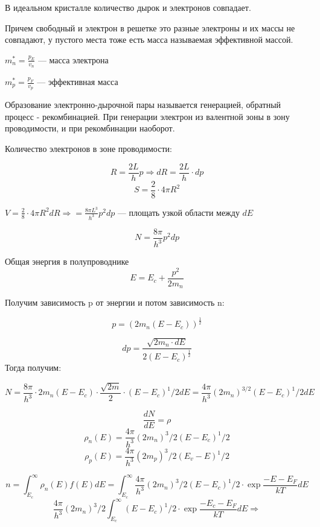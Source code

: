 \documentclass[../main.tex]{subfiles}
\begin{document}
В идеальном кристалле количество дырок и электронов совпадает.

Причем свободный и электрон в решетке это разные электроны и их массы не совпадают, у пустого места тоже есть масса называемая эффективной массой.

\begin{center}
    \(\displaystyle m^{*}_n = \frac{p_E}{v_n}\) --- масса электрона   
\end{center}

\begin{center}
    \(\displaystyle m^{*}_p = \frac{p_F}{v_p}\) --- эффективная масса   
\end{center}


 Образование электронно-дырочной пары называется генерацией, обратный процесс - рекомбинацией. 
При генерации электрон из валентной зоны в зону проводимости, и при рекомбинации наоборот.

\vspace{15px}

Количество электронов в зоне проводимости:

\[R = \frac{2L}{h}p \Rightarrow dR = \frac{2L}{h}\cdot dp  \]
\[S = \frac{2}{8} \cdot 4 \pi R^2\]

\begin{center}
    \(\displaystyle V = \frac{2}{8} \cdot 4 \pi R^2 d R \Rightarrow = \frac{8 \pi L^3}{h^3} p^2 d p\) --- площать узкой области между $d E$ 
\end{center}

\[N = \frac{8 \pi}{h^3} p^2 d p\]

Общая энергия в полупроводнике
\[E = E_c + \frac{p^2}{2m_n}\]

Получим зависимость p от энергии и потом зависимость n:

\[p =  (2m_n(E-E_c))^\frac{1}{2}\]

\[d p  = \frac{\sqrt{2m_n \cdot dE}}{2(E - E_c)^{\frac{1}{2}}}\]
Тогда получим:

\[N = \frac{8 \pi}{h^3} \cdot 2m_n(E-E_c) \cdot \frac{\sqrt{2m}}{2} \cdot (E-E_c)^1/2 dE = \frac{4 \pi}{h^3}(2m_n)^{3/2} (E-E_c)^1/2 dE\]

\[ \frac{dN}{dE} = \rho\]
\[\rho_n(E) = \frac{4 \pi}{h^3}(2m_n)^3/2 (E-E_c)^1/2\]
\[\rho_p(E) = \frac{4 \pi}{h^3}(2m_p)^3/2 (E_v-E)^1/2\]

\[n = \int_{E_c}^{\infty} \rho_n(E) f(E) dE = \int_{E_c}^{\infty} \frac{4 \pi}{h^3}(2m_n)^3/2 (E-E_c)^1/2 \cdot \exp{\frac{- E - E_F}{kT}} dE\]
\[\frac{4 \pi}{h^3}(2m_n)^3/2 \int_{E_c}^{\infty} (E-E_c)^1/2 \cdot \exp{\frac{- E_c - E_F}{kT}} d E \Rightarrow \]
\end{document}
